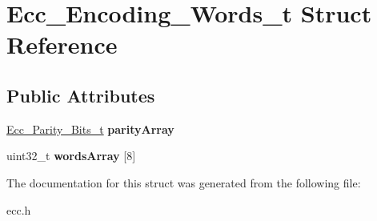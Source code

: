 \hypertarget{structEcc__Encoding__Words__t}{\section{Ecc\-\_\-\-Encoding\-\_\-\-Words\-\_\-t Struct Reference}
\label{structEcc__Encoding__Words__t}
}
\subsection*{Public Attributes}
\begin{DoxyCompactItemize}
\item 
\hypertarget{structEcc__Encoding__Words__t_a50679f8f25361774a0523f4d1901f27d}{\hyperlink{unionEcc__Parity__Bits__t}{Ecc\-\_\-\-Parity\-\_\-\-Bits\-\_\-t} {\bfseries parity\-Array}}\label{structEcc__Encoding__Words__t_a50679f8f25361774a0523f4d1901f27d}

\item 
\hypertarget{structEcc__Encoding__Words__t_a1822678d673ed4d03818faf29c5724f3}{uint32\-\_\-t {\bfseries words\-Array} \mbox{[}8\mbox{]}}\label{structEcc__Encoding__Words__t_a1822678d673ed4d03818faf29c5724f3}

\end{DoxyCompactItemize}


The documentation for this struct was generated from the following file\-:\begin{DoxyCompactItemize}
\item 
ecc.\-h\end{DoxyCompactItemize}
